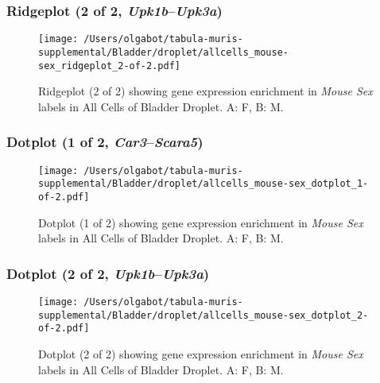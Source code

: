 \clearpage

\subsubsection{Ridgeplot (2 of 2, \emph{Upk1b}--\emph{Upk3a})}
\begin{figure}[h]
\centering
\texttt{[image: /Users/olgabot/tabula-muris-supplemental/Bladder/droplet/allcells\_mouse-sex\_ridgeplot\_2-of-2.pdf]}

\caption{ Ridgeplot (2 of 2)  showing gene expression enrichment in \emph{Mouse Sex} labels in All Cells of Bladder Droplet. A: F, B: M.}
\end{figure}


\clearpage

\subsubsection{Dotplot (1 of 2, \emph{Car3}--\emph{Scara5})}
\begin{figure}[h]
\centering
\texttt{[image: /Users/olgabot/tabula-muris-supplemental/Bladder/droplet/allcells\_mouse-sex\_dotplot\_1-of-2.pdf]}

\caption{ Dotplot (1 of 2)  showing gene expression enrichment in \emph{Mouse Sex} labels in All Cells of Bladder Droplet. A: F, B: M.}
\end{figure}


\clearpage

\subsubsection{Dotplot (2 of 2, \emph{Upk1b}--\emph{Upk3a})}
\begin{figure}[h]
\centering
\texttt{[image: /Users/olgabot/tabula-muris-supplemental/Bladder/droplet/allcells\_mouse-sex\_dotplot\_2-of-2.pdf]}

\caption{ Dotplot (2 of 2)  showing gene expression enrichment in \emph{Mouse Sex} labels in All Cells of Bladder Droplet. A: F, B: M.}
\end{figure}

